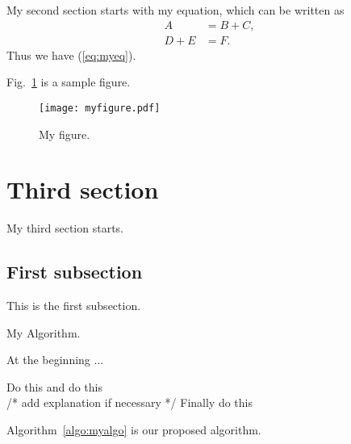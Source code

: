 \documentclass[11pt,a4paper,onecolumn,oneside]{report}
\begin{document}
My second section starts with my equation, which can be written as 
%
\begin{equation}\label{eq:myeq}
\begin{split}
	A 		&= B + C, \\
    D + E	&= F.
\end{split}
\end{equation}
Thus we have (\ref{eq:myeq}).

Fig.~\ref{fig:myfigure} is a sample figure. 

\begin{figure}[h]
\centering
\texttt{[image: myfigure.pdf]}
\caption{My figure.} \label{fig:myfigure}
\end{figure}




\newpage 
\section{Third section} 
My third section starts. 

\subsection{First subsection}
This is the first subsection. 


\begin{algorithm}
	\caption{My Algorithm.} \label{algo:myalgo}
    At the beginning ...
    
	\begin{algorithmic}[1]	    
	    \STATE Do this
        \STATE and do this\\
        /* add explanation if necessary */
        \STATE Finally do this
	\end{algorithmic} 
\end{algorithm}
%
Algorithm~\ref{algo:myalgo} is our proposed algorithm.
\end{document}
